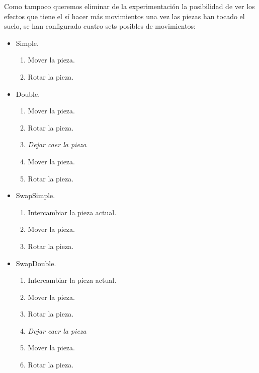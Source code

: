 \documentclass[11pt,spanish,listoffigures,listoftables]{tfgetsinf}
\begin{document}
Como tampoco queremos eliminar de la experimentación la posibilidad de ver los efectos que tiene el sí hacer más movimientos una vez las piezas han tocado el suelo, se han configurado cuatro sets posibles de movimientos:
\begin{itemize}

    \item Simple.
        \begin{enumerate}
            \item Mover la pieza.
            \item Rotar la pieza.
        \end{enumerate}
    \item Double.
        \begin{enumerate}
            \item Mover la pieza.
            \item Rotar la pieza.
            \item \textit{Dejar caer la pieza}
            \item Mover la pieza.
            \item Rotar la pieza.
        \end{enumerate}

    \item SwapSimple.
        \begin{enumerate}
            \item Intercambiar la pieza actual.
            \item Mover la pieza.
            \item Rotar la pieza.
        \end{enumerate}

    \item SwapDouble.
        \begin{enumerate}
            \item Intercambiar la pieza actual.
            \item Mover la pieza.
            \item Rotar la pieza.
            \item \textit{Dejar caer la pieza}
            \item Mover la pieza.
            \item Rotar la pieza.
        \end{enumerate}
\end{itemize}
    
\end{document}
